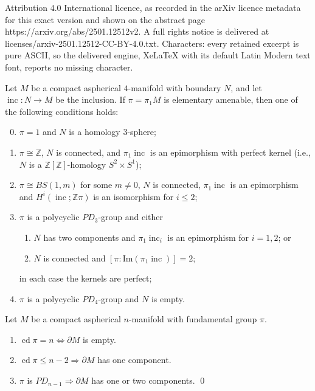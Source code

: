 \documentclass[10pt,a4paper]{amsart}
\DeclareMathOperator{\cd}{cd}
\DeclareMathOperator{\inc}{inc}
\newcommand{\Z}{\mathbb Z}
\renewcommand{\leq}{\leqslant}
\begin{document}
Attribution 4.0 International licence, as recorded in the arXiv licence metadata for this exact version and shown on the abstract page https://arxiv.org/abs/2501.12512v2. A full rights notice is delivered at licenses/arxiv-2501.12512-CC-BY-4.0.txt. Characters: every retained excerpt is pure ASCII, so the delivered engine, XeLaTeX with its default Latin Modern text font, reports no missing character.
 \begin{maintheorem} \label{A}
Let $M$ be a compact aspherical $4$-manifold with boundary $N$,
and let $\inc:N\to{M}$ be the inclusion.
If $\pi=\pi_1M$ is elementary amenable, then one of the following conditions holds:
\begin{enumerate}
 \setcounter{enumi}{-1}
\item$\pi=1$ and $N$ is a homology $3$-sphere;
\item$\pi\cong\mathbb{Z}$, $N$ is connected, and $\pi_1\inc$ 
is an epimorphism with perfect kernel 
(i.e.,  $N$ is a $\Z[\Z]$-homology $S^2\times{S^1}$);
\item$\pi\cong{BS(1,m)}$ for some $m\not=0$, $N$ is connected, 
$\pi_1\inc$ is an epimorphism and $H^i(\inc;\Z\pi)$ is an isomorphism
for $i\leq2$; 
\item$\pi$ is a polycyclic $PD_3$-group and either 
\begin{enumerate}
\item$N$ has 
two components and $\pi_1\inc_i$ is an epimorphism for $i=1,2$;
or 
\item$N$ is connected and $[\pi:\mathrm{Im}(\pi_1\inc)]=2$;
\end{enumerate}
 in each case the kernels are perfect; 
\item$\pi$ is a polycyclic $PD_4$-group and $N$ is empty.
\end{enumerate}
\end{maintheorem}

\begin{lemma} \label{components of boundary}
Let $M$ be a compact aspherical $n$-manifold with fundamental group $\pi$.
\label{boundary components}
\begin{enumerate}
\item \label{cdpin} $\cd \pi =n \Longleftrightarrow \partial M$ is empty.
\item \label{cdpin-2}$\cd \pi \leq{n-2} \Longrightarrow \partial M$ has one component.
\item \label{pdn-1} $ \pi$ is $PD_{n-1} \Longrightarrow \partial M$ has one or two components.
\qed
\end{enumerate}
\end{lemma}
\end{document}
